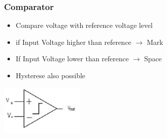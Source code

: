 \subsubsection{Comparator}
\begin{minipage}{12cm}
	\begin{itemize}
		\item Compare voltage with reference voltage level
		\item if Input Voltage higher than reference $\rightarrow$ Mark
		\item If Input Voltage lower than reference $\rightarrow$ Space
		\item Hysterese also possible
	\end{itemize}
\end{minipage}
\begin{minipage}{4cm}
	\includegraphics[width=4cm]{images/comparator.jpg}
\end{minipage}
